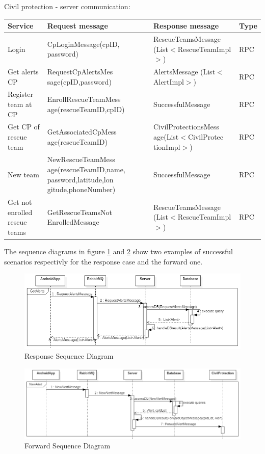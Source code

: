 \documentclass[a4paper,12pt]{report}
\begin{document}
Civil protection - server communication:

\begin{center}
\begin{tabular}{ |p{4cm}|p{4cm}|p{4cm}|p{2cm}| } 
\hline
Service 			& Request message 	& Response message		& Type 	\\
\hline
Login	& CpLoginMessage(cpID, password)	& RescueTeamsMessage (List$<$RescueTeamImpl$>$) 	& RPC	\\ 
Get alerts CP	& RequestCpAlertsMes sage(cpID,password)	& AlertsMessage (List$<$AlertImpl$>$) 	& RPC	\\ 
Register team at CP		& EnrollRescueTeamMess age(rescueTeamID,cpID)	& SuccessfulMessage & RPC	\\ 
Get CP of rescue team 	& GetAssociatedCpMess age(rescueTeamID)		& CivilProtectionsMess age(List$<$CivilProtec tionImpl$>$)	& RPC	\\ 
New team	& NewRescueTeamMess age(rescueTeamID,name, password,latitude,lon gitude,phoneNumber)	& SuccessfulMessage	& RPC	\\
Get not enrolled rescue teams & GetRescueTeamsNot EnrolledMessage	& RescueTeamsMessage (List$<$RescueTeamImpl$>$)	& RPC	\\
\hline
\end{tabular}
\end{center}

The sequence diagrams in figure \ref{fig:seqRPC} and \ref{fig:seqForward} show two examples of successful scenarios respectivly for the response case and the forward one.

\begin{figure}[ht]
\centering
\includegraphics[scale=0.5]{figures/seqRPC.png}
\caption{Response Sequence Diagram}
\label{fig:seqRPC}
\end{figure}

\begin{figure}[ht]
\centering
\includegraphics[scale=0.5]{figures/seqForward.png}
\caption{Forward Sequence Diagram}
\label{fig:seqForward}
\end{figure}
\end{document}
